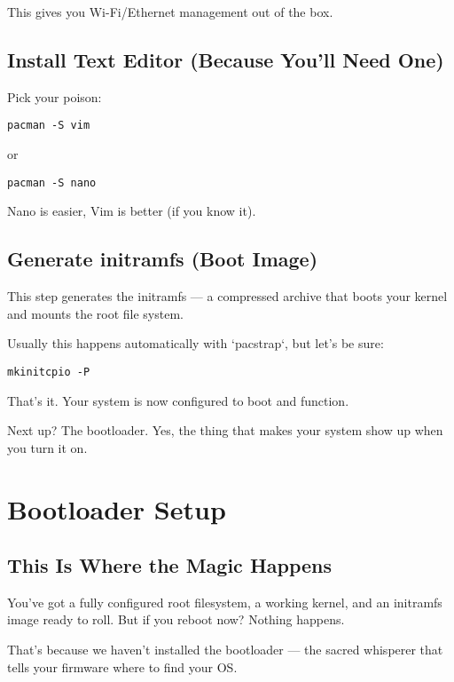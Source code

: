 \documentclass[12pt,openany]{book}
\begin{document}
This gives you Wi-Fi/Ethernet management out of the box.

\section{Install Text Editor (Because You’ll Need One)}

Pick your poison:

\begin{lstlisting}
pacman -S vim
\end{lstlisting}
or
\begin{lstlisting}
pacman -S nano
\end{lstlisting}

Nano is easier, Vim is better (if you know it).

\section{Generate initramfs (Boot Image)}

This step generates the initramfs — a compressed archive that boots your kernel and mounts the root file system.

Usually this happens automatically with `pacstrap`, but let’s be sure:

\begin{lstlisting}
mkinitcpio -P
\end{lstlisting}

That’s it. Your system is now configured to boot and function.

Next up? The bootloader. Yes, the thing that makes your system show up when you turn it on.

\clearpage



\chapter{Bootloader Setup}

\section*{This Is Where the Magic Happens}

You’ve got a fully configured root filesystem, a working kernel, and an initramfs image ready to roll. But if you reboot now? Nothing happens.

That’s because we haven’t installed the bootloader — the sacred whisperer that tells your firmware where to find your OS.
\end{document}
